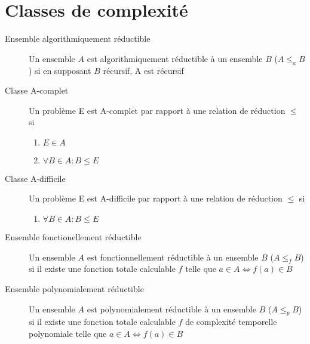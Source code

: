 \documentclass[a4paper,onecolumn,11pt]{article}
\begin{document}
\section{Classes de complexité}
\begin{description}
    \item[Ensemble algorithmiquement réductible] Un ensemble $A$ est algorithmiquement réductible à un ensemble $B$ ($A \leq_a B$) si en supposant $B$ récursif, A est récursif
	\item[Classe A-complet] Un problème E est A-complet par rapport à une relation de réduction $\leq$ si
	\begin{enumerate}
		\item $E \in A$
		\item $\forall B \in A : B \leq E$
	\end{enumerate}
	\item[Classe A-difficile] Un problème E est A-difficile par rapport à une relation de réduction $\leq$ si
	\begin{enumerate}
		\item $\forall B \in A : B \leq E$
	\end{enumerate}
	\item[Ensemble fonctionellement réductible] Un ensemble $A$ est fonctionnellement réductible à un ensemble $B$ ($A \leq_f B$) si il existe une fonction totale calculable $f$ telle que $a \in A \Leftrightarrow f(a) \in B$
	\item[Ensemble polynomialement réductible] Un ensemble $A$ est polynomialement réductible à un ensemble $B$ ($A \leq_p B$) si il existe une fonction totale calculable $f$ de complexité temporelle polynomiale telle que $a \in A \Leftrightarrow f(a) \in B$
\end{description}
\end{document}

